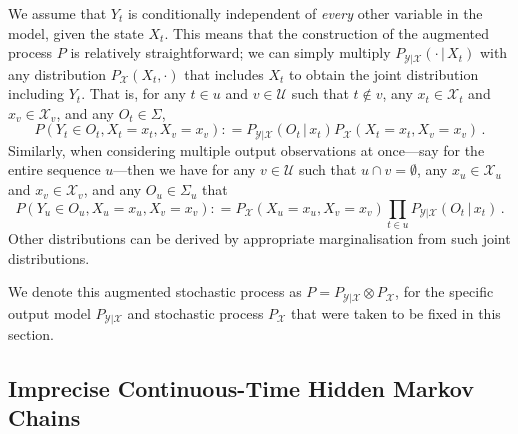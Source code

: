 \documentclass[twoside,11pt]{article}
\newcommand{\states}{\mathcal{X}}
\newcommand{\observs}{\mathcal{Y}}
\newcommand{\coloneqq}{:\!=}
\begin{document}
We assume that $Y_t$ is conditionally independent of \emph{every} other variable in the model, given the state $X_t$. This means that the construction of the augmented process $P$ is relatively straightforward; we can simply multiply $P_{\observs\vert\states}(\cdot\,\vert\,X_t)$ with any distribution $P_\states(X_t,\cdot)$ that includes $X_t$ to obtain the joint distribution including $Y_t$. That is, for any $t\in u$ and $v\in\mathcal{U}$ such that $t\notin v$, any $x_t\in\states_t$ and $x_v\in\states_v$, and any $O_t\in\Sigma$,
\begin{equation*}
P(Y_t\in O_t,X_t=x_t,X_v=x_v) \coloneqq P_{\observs\vert\states}(O_t\,\vert\,x_t)P_\states(X_t=x_t,X_v=x_v)\,.
\end{equation*}
Similarly, when considering multiple output observations at once---say for the entire sequence $u$---then we have for any $v\in\mathcal{U}$ such that $u\cap v=\emptyset$, any $x_u\in\states_u$ and $x_v\in\states_v$, and any $O_u\in\Sigma_u$ that
\begin{equation*}
P(Y_u\in O_u,X_u=x_u, X_v=x_v) \coloneqq P_\states(X_u=x_u,X_v=x_v)\prod_{t\in u} P_{\observs\vert\states}(O_{t}\,\vert\,x_{t})\,.
\end{equation*}
Other distributions can be derived by appropriate marginalisation from such joint distributions.

We denote this augmented stochastic process as $P=P_{\observs\vert\states}\otimes P_\states$,
for the specific output model $P_{\observs\vert\states}$ and stochastic process $P_\states$ that were taken to be fixed in this section.%

\subsection{Imprecise Continuous-Time Hidden Markov Chains}\label{subsec:ICTHMC}
\end{document}
